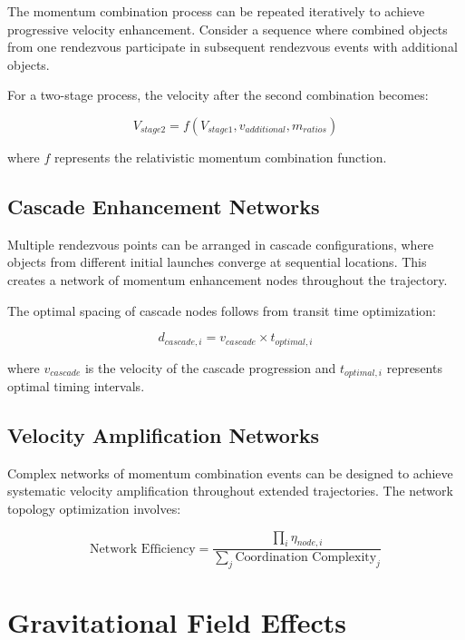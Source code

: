 \documentclass[11pt,a4paper]{article}
\theoremstyle{remark}
\begin{document}
The momentum combination process can be repeated iteratively to achieve progressive velocity enhancement. Consider a sequence where combined objects from one rendezvous participate in subsequent rendezvous events with additional objects.

For a two-stage process, the velocity after the second combination becomes:

\begin{equation}
V_{stage2} = f(V_{stage1}, v_{additional}, m_{ratios})
\label{eq:two_stage_velocity}
\end{equation}

where $f$ represents the relativistic momentum combination function.

\subsection{Cascade Enhancement Networks}

Multiple rendezvous points can be arranged in cascade configurations, where objects from different initial launches converge at sequential locations. This creates a network of momentum enhancement nodes throughout the trajectory.

The optimal spacing of cascade nodes follows from transit time optimization:

\begin{equation}
d_{cascade,i} = v_{cascade} \times t_{optimal,i}
\label{eq:cascade_spacing}
\end{equation}

where $v_{cascade}$ is the velocity of the cascade progression and $t_{optimal,i}$ represents optimal timing intervals.

\subsection{Velocity Amplification Networks}

Complex networks of momentum combination events can be designed to achieve systematic velocity amplification throughout extended trajectories. The network topology optimization involves:

\begin{equation}
\text{Network Efficiency} = \frac{\prod_{i} \eta_{node,i}}{\sum_{j} \text{Coordination Complexity}_j}
\label{eq:network_efficiency}
\end{equation}

\section{Gravitational Field Effects}
\end{document}
